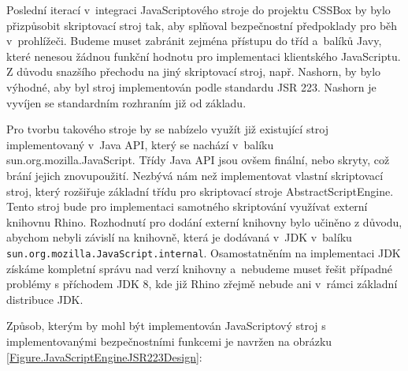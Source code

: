 Poslední iterací v~integraci JavaScriptového stroje do projektu CSSBox by bylo přizpůsobit skriptovací stroj tak, aby splňoval bezpečnostní předpoklady pro běh v~prohlížeči. Budeme muset zabránit zejména přístupu do tříd a~balíků Javy, které nenesou žádnou funkční hodnotu pro implementaci klientského JavaScriptu. Z důvodu snazšího přechodu na jiný skriptovací stroj, např. Nashorn, by bylo výhodné, aby byl stroj implementován podle standardu JSR 223. Nashorn je vyvíjen se standardním rozhraním již od základu.

Pro tvorbu takového stroje by se nabízelo využít již existující stroj implementovaný v~Java API, který se nachází v~balíku sun.org.mozilla.JavaScript. Třídy Java API jsou ovšem finální, nebo skryty, což brání jejich znovupoužití. Nezbývá nám než implementovat vlastní skriptovací stroj, který rozšiřuje základní třídu pro skriptovací stroje AbstractScriptEngine. Tento stroj bude pro implementaci samotného skriptování využívat externí knihovnu Rhino. Rozhodnutí pro dodání externí knihovny bylo učiněno z důvodu, abychom nebyli závislí na knihovně, která je dodávaná v~JDK v~balíku \texttt{sun.org.mozilla.JavaScript.internal}. Osamostatněním na implementaci JDK získáme kompletní správu nad verzí knihovny a~nebudeme muset řešit případné problémy s příchodem JDK 8, kde již Rhino zřejmě nebude ani v~rámci základní distribuce JDK.

Způsob, kterým by mohl být implementován JavaScriptový stroj s implementovanými bezpečnostními funkcemi je navržen na obrázku \ref{Figure.JavaScriptEngineJSR223Design}:

